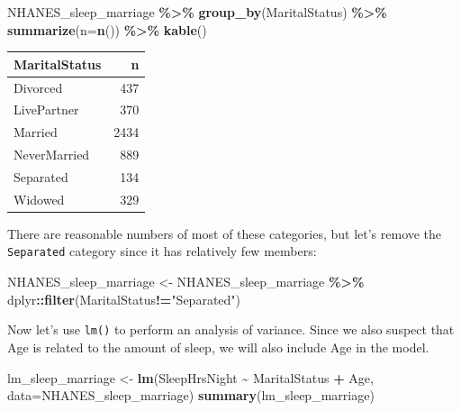 \documentclass[
  12pt,
]{book}
\newenvironment{Shaded}{\begin{snugshade}}{\end{snugshade}}
\newcommand{\AttributeTok}[1]{\textcolor[rgb]{0.13,0.29,0.53}{#1}}
\newcommand{\FunctionTok}[1]{\textcolor[rgb]{0.13,0.29,0.53}{\textbf{#1}}}
\newcommand{\NormalTok}[1]{#1}
\newcommand{\OtherTok}[1]{\textcolor[rgb]{0.56,0.35,0.01}{#1}}
\newcommand{\SpecialCharTok}[1]{\textcolor[rgb]{0.81,0.36,0.00}{\textbf{#1}}}
\newcommand{\StringTok}[1]{\textcolor[rgb]{0.31,0.60,0.02}{#1}}
\begin{document}
\begin{Shaded}
\begin{Highlighting}[]
\NormalTok{NHANES\_sleep\_marriage }\SpecialCharTok{\%\textgreater{}\%}
  \FunctionTok{group\_by}\NormalTok{(MaritalStatus) }\SpecialCharTok{\%\textgreater{}\%}
  \FunctionTok{summarize}\NormalTok{(}\AttributeTok{n=}\FunctionTok{n}\NormalTok{()) }\SpecialCharTok{\%\textgreater{}\%}
  \FunctionTok{kable}\NormalTok{()}
\end{Highlighting}
\end{Shaded}

\begin{tabular}{l|r}
\hline
MaritalStatus & n\\
\hline
Divorced & 437\\
\hline
LivePartner & 370\\
\hline
Married & 2434\\
\hline
NeverMarried & 889\\
\hline
Separated & 134\\
\hline
Widowed & 329\\
\hline
\end{tabular}

There are reasonable numbers of most of these categories, but let's remove the \texttt{Separated} category since it has relatively few members:

\begin{Shaded}
\begin{Highlighting}[]
\NormalTok{NHANES\_sleep\_marriage }\OtherTok{\textless{}{-}}
\NormalTok{  NHANES\_sleep\_marriage }\SpecialCharTok{\%\textgreater{}\%}
\NormalTok{  dplyr}\SpecialCharTok{::}\FunctionTok{filter}\NormalTok{(MaritalStatus}\SpecialCharTok{!=}\StringTok{"Separated"}\NormalTok{)}
\end{Highlighting}
\end{Shaded}

Now let's use \texttt{lm()} to perform an analysis of variance. Since we also suspect that Age is related to the amount of sleep, we will also include Age in the model.

\begin{Shaded}
\begin{Highlighting}[]
\NormalTok{lm\_sleep\_marriage }\OtherTok{\textless{}{-}} \FunctionTok{lm}\NormalTok{(SleepHrsNight }\SpecialCharTok{\textasciitilde{}}\NormalTok{ MaritalStatus }\SpecialCharTok{+}\NormalTok{ Age,}
                        \AttributeTok{data=}\NormalTok{NHANES\_sleep\_marriage)}
\FunctionTok{summary}\NormalTok{(lm\_sleep\_marriage)}
\end{Highlighting}
\end{Shaded}
\end{document}
